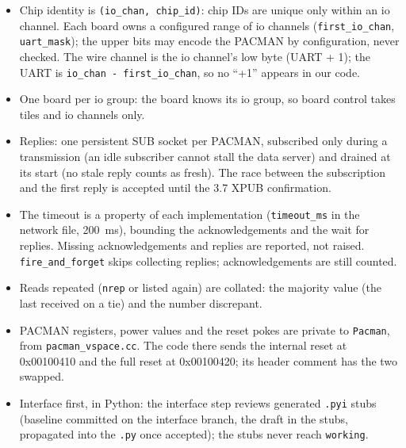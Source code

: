\documentclass[11pt]{article}
\newcommand{\h}[1]{\texttt{#1}}
\begin{document}
\begin{itemize}
\item Chip identity is \h{(io\_chan, chip\_id)}:  chip IDs are unique only within an io channel.  Each board owns a
  configured range of io channels (\h{first\_io\_chan}, \h{uart\_mask});  the upper bits may encode the PACMAN by
  configuration, never checked.  The wire channel is the io channel's low byte (UART + 1);  the UART is
  \h{io\_chan - first\_io\_chan}, so no ``+1'' appears in our code.
\item One board per io group:  the board knows its io group, so board control takes tiles and io channels only.
\item Replies:  one persistent SUB socket per PACMAN, subscribed only during a transmission (an idle subscriber cannot
  stall the data server) and drained at its start (no stale reply counts as fresh).  The race between the
  subscription and the first reply is accepted until the 3.7 XPUB confirmation.
\item The timeout is a property of each implementation (\h{timeout\_ms} in the network file, 200~ms), bounding the
  acknowledgements and the wait for replies.  Missing acknowledgements and replies are reported, not raised.
  \h{fire\_and\_forget} skips collecting replies;  acknowledgements are still counted.
\item Reads repeated (\h{nrep} or listed again) are collated:  the majority value (the last received on a tie) and the
  number discrepant.
\item PACMAN registers, power values and the reset pokes are private to \h{Pacman}, from \h{pacman\_vspace.cc}.  The
  code there sends the internal reset at 0x00100410 and the full reset at 0x00100420;  its header comment has the two
  swapped.
\item Interface first, in Python:  the interface step reviews generated \h{.pyi} stubs (baseline committed on the
  interface branch, the draft in the stubs, propagated into the \h{.py} once accepted);  the stubs never reach
  \h{working}.
\end{itemize}
\end{document}
